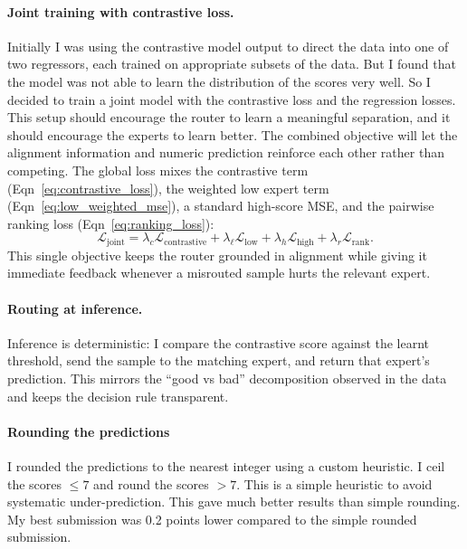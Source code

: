 \documentclass[11pt]{article}
\begin{document}
\paragraph{Joint training with contrastive loss.}
Initially I was using the contrastive model output to direct the data into one 
of two regressors, each trained on appropriate subsets of the data. But I found 
that the model was not able to learn the distribution of the scores very well. 
So I decided to train a joint model with the contrastive loss and the regression 
losses. This setup should encourage the router to learn a meaningful separation, 
and it should encourage the experts to learn better. The combined objective will 
let the alignment information and numeric prediction reinforce each other rather 
than competing. The global loss mixes the contrastive term (Eqn~\ref{eq:contrastive_loss}), the weighted low expert term (Eqn~\ref{eq:low_weighted_mse}), a standard high-score MSE, and the pairwise ranking loss (Eqn~\ref{eq:ranking_loss}):
\begin{equation}
\label{eq:joint_loss}
\mathcal{L}_{\text{joint}} = \lambda_c \mathcal{L}_{\text{contrastive}} + \lambda_{\ell} \mathcal{L}_{\text{low}} + \lambda_{h} \mathcal{L}_{\text{high}} + \lambda_{r} \mathcal{L}_{\text{rank}}.
\end{equation}
This single objective keeps the router grounded in alignment while giving it immediate feedback whenever a misrouted sample hurts the relevant expert.

\paragraph{Routing at inference.}
Inference is deterministic: I compare the contrastive score against the learnt threshold, send the sample to the matching expert, and return that expert's prediction. This mirrors the ``good vs bad'' decomposition observed in the data and keeps the decision rule transparent.

\paragraph{Rounding the predictions}
I rounded the predictions to the nearest integer using a custom heuristic. I ceil the scores $\leq 7$ and round the scores $> 7$. This is a simple heuristic to avoid systematic under-prediction. This gave much better results than simple rounding. My best submission was 0.2 points lower compared to the simple rounded submission.
\end{document}
